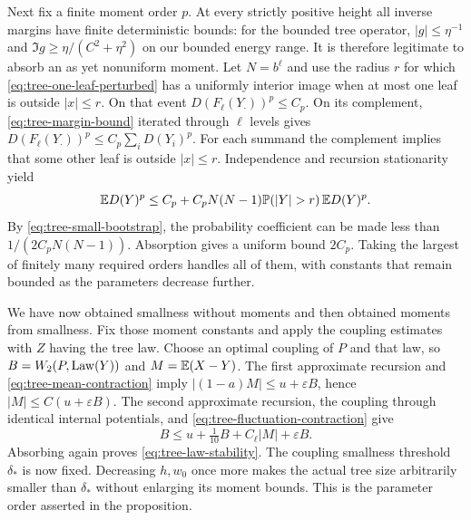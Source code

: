Next fix a finite moment order $p$.  At every strictly positive height
all inverse margins have finite deterministic bounds: for the bounded
tree operator,
$|g|\le\eta^{-1}$ and
$\Im g\ge\eta/(C^2+\eta^2)$ on our bounded energy range.
It is therefore legitimate to absorb an as yet nonuniform moment.
Let $N=b^\ell$ and use the radius $r$ for which
\eqref{eq:tree-one-leaf-perturbed} has a uniformly interior image
when at most one leaf is outside $|x|\le r$.  On that event
$D(F_\ell(Y_\cdot))^p\le C_p$.  On its complement,
\eqref{eq:tree-margin-bound} iterated through $\ell$ levels gives
$D(F_\ell(Y_\cdot))^p\le C_p\sum_iD(Y_i)^p$.
For each summand the complement implies that some other leaf is
outside $|x|\le r$.  Independence and recursion stationarity yield
\[
 \EE D(Y)^p
 \le C_p+C_pN(N-1)\PP(|Y|>r)\,\EE D(Y)^p.
\]
By \eqref{eq:tree-small-bootstrap}, the probability coefficient can
be made less than $1/(2C_pN(N-1))$.  Absorption gives a uniform
bound $2C_p$.  Taking the largest of finitely many required orders
handles all of them, with constants that remain bounded as the
parameters decrease further.

We have now obtained smallness without moments and then obtained moments
from smallness.  Fix those moment constants and apply the coupling
estimates with $Z$ having the tree law.  Choose an optimal coupling
of $P$ and that law, so $B=W_2(P,\operatorname{Law}(Y))$ and
$M=\mathbb E(X-Y)$.  The first approximate recursion and
\eqref{eq:tree-mean-contraction} imply
$|(1-a)M|\le u+\varepsilon B$, hence
$|M|\le C(u+\varepsilon B)$.  The second approximate recursion,
the coupling through identical internal potentials, and
\eqref{eq:tree-fluctuation-contraction} give
\[
 B\le u+\tfrac1{10}B+C_\ell|M|+\varepsilon B.
\]
Absorbing again proves \eqref{eq:tree-law-stability}.  The coupling
smallness threshold $\delta_*$ is now fixed.  Decreasing $h,w_0$
once more makes the actual tree size arbitrarily smaller than
$\delta_*$ without enlarging its moment bounds.  This is the
parameter order asserted in the proposition.

